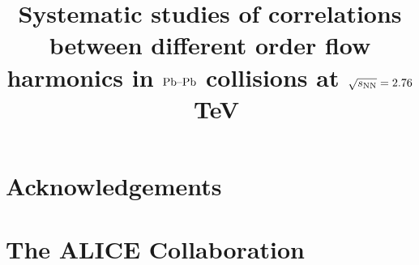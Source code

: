\documentclass[ALICE,manyauthors]{cernphprep}
\begin{document}
%
%
\newcommand{\PbPb}{\textnormal{Pb--Pb}}
\newcommand{\AuAu}{\textnormal{Au--Au}}
\newcommand{\tn}[1]{\textnormal{#1}}
\newcommand{\snn}{\ensuremath{\sqrt{s_\tn{NN}}}}
\newcommand{\CKBNOTE}[1]{{\bf CKB:  #1}} 
\renewcommand{\CKBNOTE}[1]{}  %

\newcommand{\RHNOTE}[1]{{\bf RH:  #1}} 
\renewcommand{\RHNOTE}[1]{}  %
\newcommand{\multfigsize}{0.95}
\begin{titlepage}
%
%
%
\title{Systematic studies of correlations between different order flow harmonics in $\PbPb$ collisions at $\snn = 2.76$~TeV}

%
%
\begin{abstract}

\end{abstract}
\end{titlepage}
\setcounter{page}{2}


\newenvironment{acknowledgement}{\relax}{\relax}
\begin{acknowledgement}
\section*{Acknowledgements}
\end{acknowledgement}
%
%
%
%


% 
%
%



\newpage
%
%
\appendix

\section{The ALICE Collaboration}
\label{app:collab}
%
\end{document}
